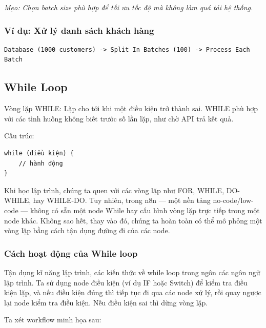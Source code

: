 \textit{Mẹo: Chọn batch size phù hợp để tối ưu tốc độ mà không làm quá tải hệ thống.}

\subsubsection{Ví dụ: Xử lý danh sách khách hàng}

\begin{verbatim}
Database (1000 customers) -> Split In Batches (100) -> Process Each Batch
\end{verbatim}

\subsection{While Loop}
Vòng lặp WHILE: Lặp cho tới khi một điều kiện trở thành sai.
WHILE phù hợp với các tình huống không biết trước số lần lặp, như chờ API trả kết quả.

Cấu trúc:

\begin{verbatim}
while (điều kiện) {
    // hành động
}
\end{verbatim}


Khi học lập trình, chúng ta quen với các vòng lặp như FOR, WHILE, DO-WHILE, hay WHILE-DO. Tuy nhiên, trong n8n — một nền tảng no-code/low-code — không có sẵn một node While hay cấu hình vòng lặp trực tiếp trong một node khác. Không sao hết, thay vào đó, chúng ta hoàn toàn có thể mô phỏng một vòng lặp bằng cách tận dụng đường đi của các node.

\subsubsection{Cách hoạt động của While loop}   

Tận dụng kĩ năng lập trình, các kiến thức về while loop trong ngôn các ngôn ngữ lập trình. Ta sử dụng node điều kiện (ví dụ IF hoặc Switch) để kiểm tra điều kiện lặp, và nếu điều kiện đúng thì tiếp tục đi qua các node xử lý, rồi quay ngược lại node kiểm tra điều kiện. Nếu điều kiện sai thì dừng vòng lặp.

Ta xét workflow minh họa sau:

